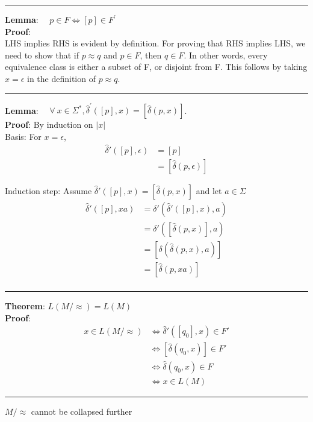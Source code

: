 \documentclass{report}
\newcommand{\dhat}{\hat{\delta}}
\newcommand{\hr}{\hrule\vspace{4mm}}
\begin{document}
\hr

\textbf{Lemma}: $\quad p \in F \Leftrightarrow [p] \in F^{\prime}$ \\
\textbf{Proof}: \\
LHS implies RHS is evident by definition. For proving that RHS implies LHS, we need to show that if $p \approx q$ and $p \in F$, then $q \in F$. In other words, every equivalence class is either a subset of F, or disjoint from F. This follows by taking $x = \epsilon$ in the definition of $p \approx q$. \\

\hr

\textbf{Lemma}: $\quad \forall \ x \in \Sigma^*, \hat{\delta}^{\prime}([p], x)=[\hat{\delta}(p, x)]$. \\
\textbf{Proof}: By induction on $|x|$ \\
Basis: For $x = \epsilon$,
\begin{align*}
  \dhat'([p],\epsilon) & = [p]                 \\
                       & = [\dhat(p,\epsilon)]
\end{align*}

Induction step: Assume $\dhat'([p],x) = [\dhat(p,x)]$ and let $a \in \Sigma$
\begin{align*}
  \dhat'([p],xa) & = \delta'(\dhat'([p],x),a) \\
                 & = \delta'([\dhat(p,x)],a)  \\
                 & = [\delta(\dhat(p,x),a)]   \\
                 & = [\dhat(p,xa)]            \\
\end{align*}

\hr

\textbf{Theorem}: $L(M/\approx) = L(M)$ \\
\textbf{Proof}:
\begin{align*}
  x \in L(M/\approx) & \iff \dhat'([q_0],x) \in F' \\
                     & \iff [\dhat(q_0,x)] \in F'  \\
                     & \iff \dhat(q_0,x) \in F     \\
                     & \iff x \in L(M)
\end{align*}

\hr

{\Large $M/\approx$ cannot be collapsed further} \\
\end{document}
